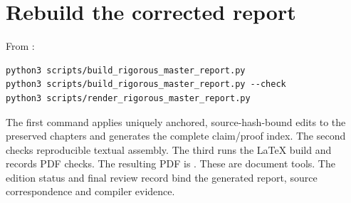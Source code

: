 

\section{Rebuild the corrected report}\label{rebuild-the-report}

From :
\begin{verbatim}
python3 scripts/build_rigorous_master_report.py
python3 scripts/build_rigorous_master_report.py --check
python3 scripts/render_rigorous_master_report.py
\end{verbatim}
The first command applies uniquely anchored, source-hash-bound edits to the preserved chapters and generates the complete claim/proof index. The second checks reproducible textual assembly. The third runs the LaTeX build and records PDF checks. The resulting PDF is . These are document tools. The edition status and final review record bind the generated report, source correspondence and compiler evidence.


